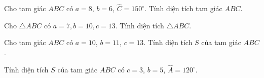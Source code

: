 \begin{bt}%
	Cho tam giác $ABC$ có $a=8$, $b=6$, $\widehat{C}=150^\circ$. Tính diện tích tam giác $ABC$.
\end{bt}

\begin{bt}	%
	Cho $\triangle A B C$ có $a=7, b=10, c=13$. Tính diện tích $\triangle A B C$.
\end{bt}

\begin{bt}%
    Cho tam giác $ABC$ có $a=10$, $b=11$, $c=13$. Tính diện tích $S$ của tam giác $ABC$.
\end{bt}

\begin{bt}%
    Tính diện tích $S$ của tam giác $ABC$ có $c=3$, $b=5$, $\widehat{A}=120^{\circ}$.
\end{bt}


